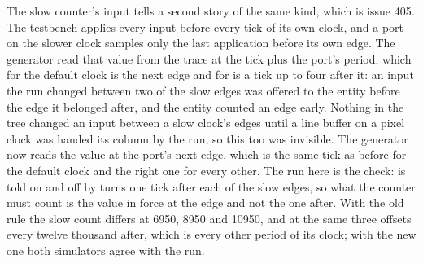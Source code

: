 The slow counter's input tells a second story of the same kind, which
is issue 405. The testbench applies every input before every tick of
its own clock, and a port on the slower clock samples only the last
application before its own edge. The generator read that value from
the trace at the tick plus the port's period, which for the default
clock is the next edge and for  is a tick up to four
after it: an input the run changed between two of the slow edges was
offered to the entity before the edge it belonged after, and the
entity counted an edge early. Nothing in the tree changed an input
between a slow clock's edges until a line buffer on a pixel clock was
handed its column by the run, so this too was invisible. The
generator now reads the value at the port's next edge, which is the
same tick as before for the default clock and the right one for every
other. The run here is the check:  is told on and off
by turns one tick after each of the slow edges, so what the counter
must count is the value in force at the edge and not the one after.
With the old rule the slow count differs at 6950, 8950 and 10950,
and at the same three offsets every twelve thousand after, which is
every other period of its clock; with the new one both simulators
agree with the run.


